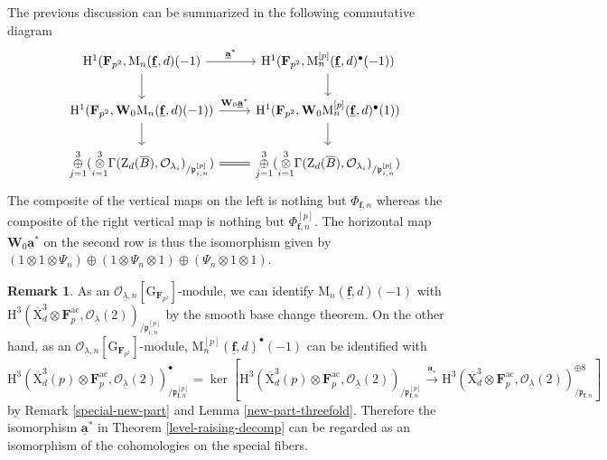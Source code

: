 \documentclass[10pt]{amsart}
\numberwithin{equation}{section}
\theoremstyle{plain}
\numberwithin{equation}{section}
\theoremstyle{definition}
\newtheorem{remark}[equation]{Remark}
\theoremstyle{remark}
\def\ac{\mathrm{ac}}
\def\ac{\mathrm{ac}}
\def\undlamb{\underline{\lambda}}
\def\triplef{\underline{\mathbf{f}}}
\def\threetensor{\overset{3}{\underset{i=1}\otimes}}
\def\threesum{\overset{3}{\underset{j=1}\oplus} }
\def\calO{\mathcal{O}}
\def\frakp{\mathfrak{p}}
\def\FF{\mathbf{F}}
\def\rmG{\mathrm{G}}
\def\rmH{\mathrm{H}}
\def\rmM{\mathrm{M}}
\def\rmX{\mathrm{X}}
\def\rmZ{\mathrm{Z}}
\def\bfW{\mathbf{W}}
\begin{document}
The previous discussion can be summarized in the following commutative diagram
\begin{equation}\label{a-commu}
\begin{tikzcd}
\rmH^{1}(\FF_{p^{2}}, \rmM_{n}(\triplef, d)(-1) \arrow[r, "\underline{\mathbf{a}}^{\ast}"] \arrow[d] & \rmH^{1}(\FF_{p^{2}}, \rmM^{[p]}_{n}(\triplef, d)^{\bullet}(-1) )\arrow[d] \\
\rmH^{1}(\FF_{p^{2}},{\bfW}_{0}\rmM_{n}(\triplef, d)(-1))\arrow[r, "{\bfW}_{0}\underline{\mathbf{a}}^{\ast}"] \arrow[d] & \rmH^{1}(\FF_{p^{2}},{\bfW}_{0}\rmM^{[p]}_{n}(\triplef, d)^{\bullet}(1)) \arrow[d] \\
\threesum(\threetensor\Gamma(\rmZ_{d}(\overline{B}),\calO_{\lambda_{i}})_{/\frakp^{[p]}_{i,n}})   \arrow[r, Rightarrow, no head]       &\threesum(\threetensor\Gamma(\rmZ_{d}(\overline{B}),\calO_{\lambda_{i}})_{/\frakp^{[p]}_{i,n}}) 
\end{tikzcd}
\end{equation}
The composite of the vertical maps on the left is nothing but $\Phi_{\triplef, n}$ whereas the composite of the right vertical map is nothing but $\Phi^{[p]}_{\triplef, n}$.
The horizontal map ${\bfW}_{0}\underline{\mathbf{a}}^{\ast}$ on the second row is thus the isomorphism given by $(1\otimes1\otimes\Psi_{n})\oplus(1\otimes\Psi_{n}\otimes 1)\oplus (\Psi_{n}\otimes1\otimes1)$.

\begin{remark}\label{special-new}
As  an $\calO_{\undlamb, n}[\rmG_{\FF_{p^{2}}}]$-module, we can identify $\rmM_{n}(\triplef, d)(-1)$ with 
$\rmH^{3}(\overline{\rmX}^{3}_{d}\otimes{\FF}^{\ac}_{p}, \calO_{\undlamb}(2))_{/\frakp^{[p]}_{i,n}}$
by the smooth base change theorem. On the other hand, as an $\calO_{\undlamb, n}[\rmG_{\FF_{p^{2}}}]$-module, $\rmM^{[p]}_{n}(\triplef, d)^{\bullet}(-1)$ can be identified with 
\begin{equation*}
\rmH^{3}(\overline{\rmX}^{3}_{d}(p)\otimes{\FF}^{\ac}_{p}, \calO_{\undlamb}(2))^{\bullet}_{/{\frakp}^{[p]}_{\triplef, n}}=\ker[\rmH^{3}(\overline{\rmX}^{3}_{d}(p)\otimes{\FF}^{\ac}_{p}, \calO_{\undlamb}(2))_{/{\frakp}^{[p]}_{\triplef, n}}\xrightarrow{\underline{\mathbf{a}}_{\ast}} \rmH^{3}(\overline{\rmX}^{3}_{d}\otimes{\FF}^{\ac}_{p}, \calO_{\undlamb}(2))^{\oplus 8}_{/{\frakp}_{\triplef, n}}]
\end{equation*}
by  Remark \ref{special-new-part} and Lemma \ref{new-part-threefold}. Therefore the isomorphism $\underline{\mathbf{a}}^{\ast}$ in Theorem \ref{level-raising-decomp} can be regarded as an isomorphism of the cohomologies on the special fibers. 
\end{remark}
\end{document}
